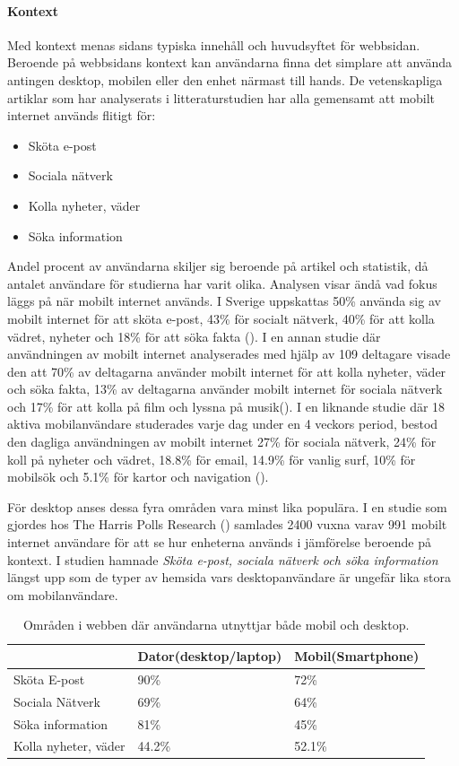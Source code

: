 \documentclass[11pt]{article}
\begin{document}
\paragraph{Kontext}\mbox{}

Med kontext menas sidans typiska innehåll och huvudsyftet för webbsidan. Beroende på webbsidans kontext kan användarna finna det simplare att använda antingen desktop, mobilen eller den enhet närmast till hands. De vetenskapliga artiklar som har analyserats i litteraturstudien har alla gemensamt att mobilt internet används flitigt för:

\begin{itemize}
	\item{Sköta e-post}
	\item{Sociala nätverk}
	\item{Kolla nyheter, väder}
	\item{Söka information}
\end{itemize}
\bigskip
Andel procent av användarna skiljer sig beroende på artikel och statistik, då antalet användare för studierna har varit olika. Analysen visar ändå vad fokus läggs på när mobilt internet används. I Sverige uppskattas  50\% använda sig av mobilt internet för att sköta e-post, 43\% för socialt nätverk, 40\% för att kolla vädret, nyheter och 18\% för att söka fakta (\cite[s. 25]{.se}). I en annan studie där användningen av mobilt internet analyserades med hjälp av 109 deltagare visade den att 70\% av deltagarna använder mobilt internet för att kolla nyheter, väder och söka fakta, 13\% av deltagarna använder mobilt internet för sociala nätverk och 17\% för att kolla på film och lyssna på musik(\cite{usageusability2}). I en liknande studie där 18 aktiva mobilanvändare studerades varje dag under en 4 veckors period, bestod den dagliga användningen av mobilt internet 27\% för sociala nätverk, 24\% för koll på nyheter och vädret, 18.8\% för email, 14.9\% för vanlig surf, 10\% för mobilsök och 5.1\% för kartor och navigation (\cite{mobilewebsearch}).

För desktop anses dessa fyra områden vara minst lika populära. I en studie som gjordes hos The Harris Polls Research (\cite{harrispoll}) samlades 2400 vuxna varav 991 mobilt internet användare för att se hur enheterna används i jämförelse beroende på kontext. I studien hamnade \textit{Sköta e-post, sociala nätverk och söka information} längst upp som de typer av hemsida vars desktopanvändare är ungefär lika stora om mobilanvändare.
\\
\begin{table}[H]
	\centering
	\begin{tabular}{|p{4cm}|p{4cm}|p{4cm}|}
	\hline
	~&Dator(desktop/laptop)&Mobil(Smartphone)\\ \hline
	Sköta E-post &90\%&72\%\\ \hline
	Sociala Nätverk&69\%&64\%\\ \hline
	Söka information&81\%&45\%\\ \hline
	Kolla nyheter, väder&44.2\%&52.1\%\\ \hline
	\end{tabular}
    \caption {Områden i webben där användarna utnyttjar både mobil och desktop.}
\end{table}
\end{document}
